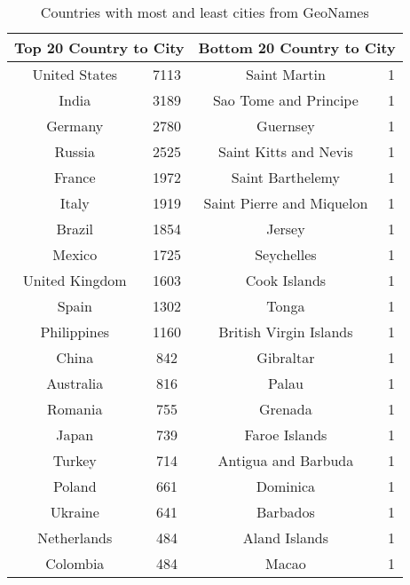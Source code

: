 \begin{table}
\small
\caption{Countries with most and least cities from GeoNames}
\label{table_1_app2}
\begin{center}
\begin{tabular}{|c|c|c|c|}
\multicolumn{2}{c}{\bfseries Top 20 Country to City} &
\multicolumn{2}{c}{\bfseries Bottom 20 Country to City}\\
\hline
United States & 7113 & Saint Martin & 1 \\
\hline
India & 3189 & Sao Tome and Principe & 1 \\
\hline
Germany & 2780 & Guernsey & 1 \\
\hline
Russia & 2525 & Saint Kitts and Nevis & 1 \\
\hline
France & 1972 & Saint Barthelemy & 1 \\
\hline
Italy & 1919 & Saint Pierre and Miquelon & 1 \\
\hline
Brazil & 1854 & Jersey & 1 \\
\hline
Mexico & 1725 & Seychelles & 1 \\
\hline
United Kingdom & 1603 & Cook Islands & 1 \\
\hline
Spain & 1302 & Tonga & 1 \\
\hline
Philippines & 1160 & British Virgin Islands & 1 \\
\hline
China & 842 & Gibraltar & 1 \\
\hline
Australia & 816 & Palau & 1 \\
\hline
Romania & 755 & Grenada & 1 \\
\hline
Japan & 739 & Faroe Islands & 1 \\
\hline
Turkey & 714 & Antigua and Barbuda & 1 \\
\hline
Poland & 661 & Dominica & 1 \\
\hline
Ukraine & 641 & Barbados & 1 \\
\hline
Netherlands & 484 & Aland Islands & 1 \\
\hline
Colombia & 484 & Macao & 1 \\
\hline
\end{tabular}
\end{center}
\end{table}

